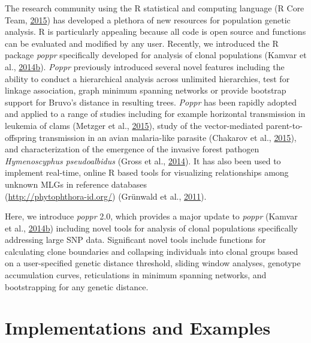 \documentclass[double,11pt]{beavtex}
\begin{document}
  The research community using the R statistical and computing language (R
  Core Team, \protect\hyperlink{ref-R}{2015}) has developed a plethora of
  new resources for population genetic analysis. R is particularly
  appealing because all code is open source and functions can be evaluated
  and modified by any user. Recently, we introduced the R package
  \emph{poppr} specifically developed for analysis of clonal populations
  (Kamvar et al.,
  \protect\hyperlink{ref-kamvar2014poppr}{2014}\protect\hyperlink{ref-kamvar2014poppr}{b}).
  \emph{Poppr} previously introduced several novel features including the
  ability to conduct a hierarchical analysis across unlimited hierarchies,
  test for linkage association, graph minimum spanning networks or provide
  bootstrap support for Bruvo's distance in resulting trees. \emph{Poppr}
  has been rapidly adopted and applied to a range of studies including for
  example horizontal transmission in leukemia of clams (Metzger et al.,
  \protect\hyperlink{ref-metzger2015horizontal}{2015}), study of the
  vector-mediated parent-to-offspring transmission in an avian
  malaria-like parasite (Chakarov et al.,
  \protect\hyperlink{ref-chakarov2015apparent}{2015}), and
  characterization of the emergence of the invasive forest pathogen
  \emph{Hymenoscyphus pseudoalbidus} (Gross et al.,
  \protect\hyperlink{ref-gross2014population}{2014}). It has also been
  used to implement real-time, online R based tools for visualizing
  relationships among unknown MLGs in reference databases\\
  (\url{http://phytophthora-id.org/}) (Grünwald et al.,
  \protect\hyperlink{ref-grunwald2011phytophthora}{2011}).
  
  Here, we introduce \emph{poppr} 2.0, which provides a major update to
  \emph{poppr} (Kamvar et al.,
  \protect\hyperlink{ref-kamvar2014poppr}{2014}\protect\hyperlink{ref-kamvar2014poppr}{b})
  including novel tools for analysis of clonal populations specifically
  addressing large SNP data. Significant novel tools include functions for
  calculating clone boundaries and collapsing individuals into clonal
  groups based on a user-specified genetic distance threshold, sliding
  window analyses, genotype accumulation curves, reticulations in minimum
  spanning networks, and bootstrapping for any genetic distance.
  
  \section{Implementations and
  Examples}\label{implementations-and-examples}
  
\end{document}
